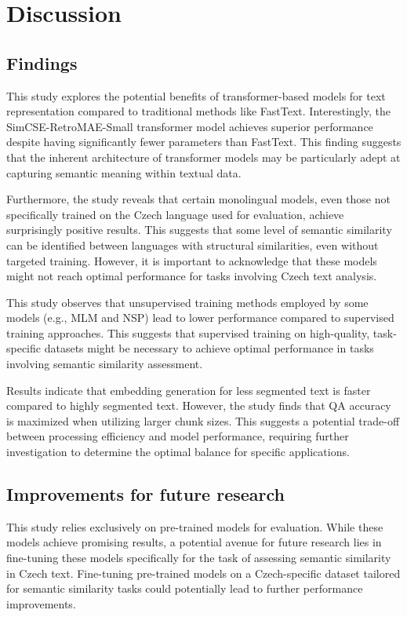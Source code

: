 
\chapter{Discussion\label{chap:discussion}}

\section{Findings}
This study explores the potential benefits of transformer-based models for text representation compared to traditional methods like FastText.
Interestingly, the SimCSE-RetroMAE-Small transformer model achieves superior performance despite having significantly fewer parameters than FastText.
This finding suggests that the inherent architecture of transformer models may be particularly adept at capturing semantic meaning within textual data.

Furthermore, the study reveals that certain monolingual models, even those not specifically trained on the Czech language used for evaluation, achieve surprisingly positive results.
This suggests that some level of semantic similarity can be identified between languages with structural similarities, even without targeted training.
However, it is important to acknowledge that these models might not reach optimal performance for tasks involving Czech text analysis.

This study observes that unsupervised training methods employed by some models (e.g., \ac{MLM} and \ac{NSP}) lead to lower performance compared to supervised training approaches.
This suggests that supervised training on high-quality, task-specific datasets might be necessary to achieve optimal performance in tasks involving semantic similarity assessment.

Results indicate that embedding generation for less segmented text is faster compared to highly segmented text.
However, the study finds that \ac{QA} accuracy is maximized when utilizing larger chunk sizes.
This suggests a potential trade-off between processing efficiency and model performance, requiring further investigation to determine the optimal balance for specific applications.

\section{Improvements for future research}
This study relies exclusively on pre-trained models for evaluation.
While these models achieve promising results, a potential avenue for future research lies in fine-tuning these models specifically for the task of assessing semantic similarity in Czech text.
Fine-tuning pre-trained models on a Czech-specific dataset tailored for semantic similarity tasks could potentially lead to further performance improvements.

